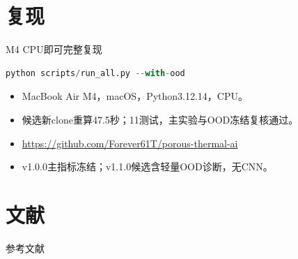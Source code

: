 \documentclass[10pt,aspectratio=169]{beamer}
\newcommand{\source}[1]{\par\vspace{1mm}{\scriptsize #1}}
\begin{document}
\section{复现}
\begin{frame}[fragile]{M4 CPU即可完整复现}
\begin{lstlisting}[language=python]
python scripts/run_all.py --with-ood
\end{lstlisting}
\begin{itemize}
\item MacBook Air M4，macOS，Python3.12.14，CPU。
\item 候选新clone重算47.5秒；11测试，主实验与OOD冻结复核通过。
\item \url{https://github.com/Forever61T/porous-thermal-ai}
\item v1.0.0主指标冻结；v1.1.0候选含轻量OOD诊断，无CNN。
\end{itemize}
\source{47.5秒包含补充诊断，不含安装；主实验49行/70计划，OOD16行/40计划。}
\end{frame}
\section{文献}
\begin{frame}[allowframebreaks]{参考文献}\footnotesize{}\end{frame}
\end{document}
